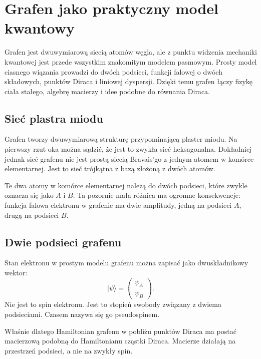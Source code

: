 \chapter{Grafen jako praktyczny model kwantowy}

\begin{summarybox}
Grafen jest dwuwymiarową siecią atomów węgla, ale z punktu widzenia mechaniki
kwantowej jest przede wszystkim znakomitym modelem pasmowym. Prosty model ciasnego
wiązania prowadzi do dwóch podsieci, funkcji falowej o dwóch składowych, punktów
Diraca i liniowej dyspersji. Dzięki temu grafen łączy fizykę ciała stałego,
algebrę macierzy i idee podobne do równania Diraca.
\end{summarybox}

\section{Sieć plastra miodu}

Grafen tworzy dwuwymiarową strukturę przypominającą plaster miodu. Na pierwszy rzut oka można sądzić, że jest to zwykła sieć heksagonalna. Dokładniej jednak sieć grafenu nie jest prostą siecią Bravais'go z jednym atomem w komórce elementarnej. Jest to sieć trójkątna z bazą złożoną z dwóch atomów.

Te dwa atomy w komórce elementarnej należą do dwóch podsieci, które zwykle oznacza się jako \(A\) i \(B\). Ta pozornie mała różnica ma ogromne konsekwencje: funkcja falowa elektronu w grafenie ma dwie amplitudy, jedną na podsieci \(A\), drugą na podsieci \(B\).

\section{Dwie podsieci grafenu}

Stan elektronu w prostym modelu grafenu można zapisać jako dwuskładnikowy wektor:
\begin{equation}
    |\psi\rangle=\begin{pmatrix}\psi_A\\\psi_B\end{pmatrix}.
\end{equation}
Nie jest to spin elektronu. Jest to stopień swobody związany z dwiema podsieciami. Czasem nazywa się go pseudospinem.

Właśnie dlatego Hamiltonian grafenu w pobliżu punktów Diraca ma postać macierzową podobną do Hamiltonianu cząstki Diraca. Macierze działają na przestrzeń podsieci, a nie na zwykły spin.

